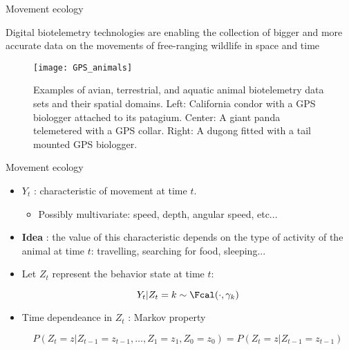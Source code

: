 \documentclass[compress,10pt]{beamer}
\begin{document}
\begin{frame}[allowframebreaks]{Movement ecology}

 
Digital biotelemetry technologies are enabling the collection of bigger and more accurate data on the movements of free-ranging wildlife in space and time 
 
\begin{figure}
\centering
 \texttt{[image: GPS\_animals]}
\caption{\scriptsize Examples of avian, terrestrial, and aquatic animal biotelemetry data sets and their spatial domains. Left: California condor with a
GPS biologger attached to its patagium. Center: A giant panda telemetered with a GPS collar. Right: A dugong fitted with a tail mounted GPS biologger. \cite{Tracey2014}}
\end{figure}

 \end{frame}



\begin{frame}{Movement ecology}



\begin{itemize}
 \item $Y_t$ : characteristic of movement at time $t$. 
 
 \begin{itemize}
 \item Possibly multivariate: speed, depth, angular speed, etc... 
 \end{itemize}
 
 \item \textbf{Idea} : the value of this characteristic depends on the type of activity of the animal at time $t$: travelling, searching for food, sleeping...
 
 \item Let $Z_t$ represent the  behavior state at time $t$: 
 
 $$Y_t | Z_t = k \sim \Fcal(\cdot,\gamma_k)$$
 
 
 \item Time dependeance in $Z_t$ :  Markov  property 

$$P(Z_{t} = z | Z_{t-1} = z_{t-1}, \dots, Z_{1} = z_{1},Z_{0} = z_{0}  )  =
 P(Z_{t} = z | Z_{t-1} = z_{t-1}) $$ 
 
 \end{itemize}






\end{frame}
\end{document}
